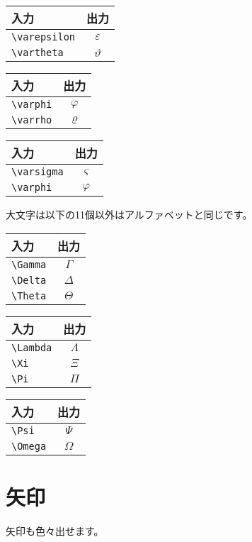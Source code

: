 \begin{tabular}{lc}
入力 & 出力 \\ \hline
\verb|\varepsilon| & $\varepsilon$ \\
\verb|\vartheta| & $\vartheta$ \\
\end{tabular}
\begin{tabular}{lc}
入力 & 出力 \\ \hline
\verb|\varphi| & $\varphi$ \\
\verb|\varrho| & $\varrho$ \\
\end{tabular}
\begin{tabular}{lc}
入力 & 出力 \\ \hline
\verb|\varsigma| & $\varsigma$ \\
\verb|\varphi| & $\varphi$ \\
\end{tabular}

大文字は以下の11個以外はアルファベットと同じです。

\begin{tabular}{lc}
入力 & 出力 \\ \hline
\verb|\Gamma| & $\Gamma$ \\
\verb|\Delta| & $\Delta$ \\
\verb|\Theta| & $\Theta$ \\
\end{tabular}
\begin{tabular}{lc}
入力 & 出力 \\ \hline
\verb|\Lambda| & $\Lambda$ \\
\verb|\Xi| & $\Xi$ \\
\verb|\Pi| & $\Pi$ \\
\end{tabular}
\begin{tabular}{lc}
入力 & 出力 \\ \hline
\verb|\Psi| & $\Psi$ \\
\verb|\Omega| & $\Omega$ \\
\end{tabular}



\section{矢印}
矢印も色々出せます。

